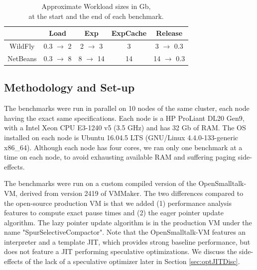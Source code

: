 \documentclass[sigplan,10pt,screen]{acmart}\settopmatter{printfolios=true,printccs=true,printacmref=true}
\newcommand{\egb}[1]{\color{blue}\fbox{\bfseries\sffamily\scriptsize Elisa:}{\sf\small$\blacktriangleright$\textit{#1}$\blacktriangleleft$}\color{black}}
\newcommand{\eem}[1]{\color{olive}\fbox{\bfseries\sffamily\scriptsize Eliot:}{\sf\small$\blacktriangleright$\textit{#1}$\blacktriangleleft$}\color{black}}
\def\OpenSmalltalkVM{OpenSmalltalk-VM\xspace}
\begin{document}
\begin{table} [th]
\centering
\captionsetup{justification=centering}
\vspace{-0.2cm}
\caption{Approximate Workload sizes in Gb,\\
at the start and the end of each benchmark.\vspace{-0.2cm}}
\begin{tabular}{c|c|c|c|c}
   				& Load 			& Exp 		& \small{ExpCache}	& Release \\
	\hline
   	WildFly		& 0.3 $\rightarrow$ 2 	& 2 $\rightarrow$ 3	& 3 		& 3 $\rightarrow$ 0.3 \\
   	NetBeans		& 0.3 $\rightarrow$ 8 	& 8 $\rightarrow$ 14 	& 14 		& 14 $\rightarrow$ 0.3 \\
\end{tabular} 
\vspace{-0.4cm}
\label{tab:workloadSize}
\end{table}

\subsection{Methodology and Set-up}

\def\numRuns{30\xspace}

The benchmarks were run in parallel on 10 nodes of the same cluster, each node having the exact same specifications. Each node is a HP ProLiant DL20 Gen9, with a Intel Xeon CPU E3-1240 v5 (3.5 GHz) and has 32 Gb of RAM. The OS installed on each node is Ubuntu 16.04.5 LTS (GNU/Linux 4.4.0-133-generic x86\_64). Although each node has four cores, we ran only one benchmark at a time on each node, to avoid exhausting available RAM and suffering paging side-effects.

The benchmarks were run on a custom compiled version of the \OpenSmalltalkVM, derived from version 2419 of VMMaker. The two differences compared to the open-source production VM is that we added (1) performance analysis features to compute exact pause times and (2) the eager pointer update algorithm. 
The lazy pointer update algorithm is in the production VM under the name "SpurSelectiveCompactor". 
Note that the \OpenSmalltalkVM features an interpreter and a template JIT, which provides strong baseline performance, but does not feature a JIT performing speculative optimizations. We discuss the side-effects of the lack of a speculative optimizer later in Section \ref{sec:optJITDisc}.
\end{document}
